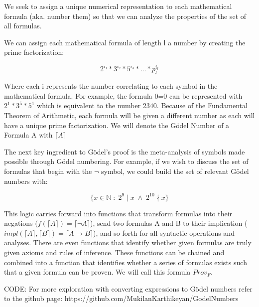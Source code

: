 \documentclass[conference]{IEEEtran}
\begin{document}
We seek to assign a unique numerical representation to each mathematical formula (aka. number them) so that we can analyze the properties of the set of all formulas.

We can assign each mathematical formula of length l a number by creating the prime factorization: 

\[2^{i_1}*3^{i_2}*5^{i_3}*...*p_l^{i_l}\] 

Where each i represents the number correlating to each symbol in the mathematical formula. For example, the formula 0=0 can be represented with $2^1*3^5*5^1$ which is equivalent to the number 2340. Because of the Fundamental Theorem of Arithmetic, each formula will be given a different number as each will have a unique prime factorization. We will denote the Gödel Number of a Formula A with $\lceil A \rceil$

The next key ingredient to Gödel's proof is the meta-analysis of symbols made possible through Gödel numbering. For example, if we wish to discuss the set of formulas that begin with the $\neg$ symbol, we could build the set of relevant Gödel numbers with:

\[\{x \in \mathbb{N} \; : \;2^9\mid x \; \land \; 2^{10} \nmid x\}\]

This logic carries forward into functions that transform formulas into their negations ($f(
\lceil A \rceil ) = \lceil \neg A \rceil$), send two formulas A and B to their implication ($impl(\lceil A \rceil , \lceil B \rceil ) = \lceil A \rightarrow B \rceil$), and so forth for all syntactic operations and analyses. There are even functions that identify whether given formulas are truly given axioms and rules of inference. These functions can be chained and combined into a function that identifies whether a series of formulas exists such that a given formula can be proven. We will call this formula $Prov_F$.


CODE: 
For more exploration with converting expressions to Gödel numbers refer to the github page: https://github.com/MukilanKarthikeyan/GodelNumbers
\end{document}
